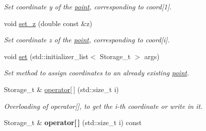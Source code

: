 \begin{DoxyCompactItemize}
\begin{DoxyCompactList}\small\item\em Set coordinate y of the \hyperlink{classBGLgeom_1_1point}{point}, corresponding to coord\mbox{[}1\mbox{]}. \item\end{DoxyCompactList}\item 
\hypertarget{classBGLgeom_1_1point_a755d7223bac21caa068101d882b5698e}{
void \hyperlink{classBGLgeom_1_1point_a755d7223bac21caa068101d882b5698e}{set\_\-z} (double const \&z)}
\label{classBGLgeom_1_1point_a755d7223bac21caa068101d882b5698e}

\begin{DoxyCompactList}\small\item\em Set coordinate z of the \hyperlink{classBGLgeom_1_1point}{point}, corresponding to coord\mbox{[}i\mbox{]}. \item\end{DoxyCompactList}\item 
\hypertarget{classBGLgeom_1_1point_ae9e2b115498ddb344bc096282b845de0}{
void \hyperlink{classBGLgeom_1_1point_ae9e2b115498ddb344bc096282b845de0}{set} (std::initializer\_\-list$<$ Storage\_\-t $>$ args)}
\label{classBGLgeom_1_1point_ae9e2b115498ddb344bc096282b845de0}

\begin{DoxyCompactList}\small\item\em Set method to assign coordinates to an already existing \hyperlink{classBGLgeom_1_1point}{point}. \item\end{DoxyCompactList}\item 
\hypertarget{classBGLgeom_1_1point_acc90694fd1c0e081aac05e2e29b9c578}{
Storage\_\-t \& \hyperlink{classBGLgeom_1_1point_acc90694fd1c0e081aac05e2e29b9c578}{operator\mbox{[}$\,$\mbox{]}} (std::size\_\-t i)}
\label{classBGLgeom_1_1point_acc90694fd1c0e081aac05e2e29b9c578}

\begin{DoxyCompactList}\small\item\em Overloading of operator\mbox{[}\mbox{]}, to get the i-\/th coordinate or write in it. \item\end{DoxyCompactList}\item 
\hypertarget{classBGLgeom_1_1point_ac004666eee20545af3d5dbb6f8301363}{
Storage\_\-t \& {\bfseries operator\mbox{[}$\,$\mbox{]}} (std::size\_\-t i) const }
\label{classBGLgeom_1_1point_ac004666eee20545af3d5dbb6f8301363}


\end{DoxyCompactItemize}

